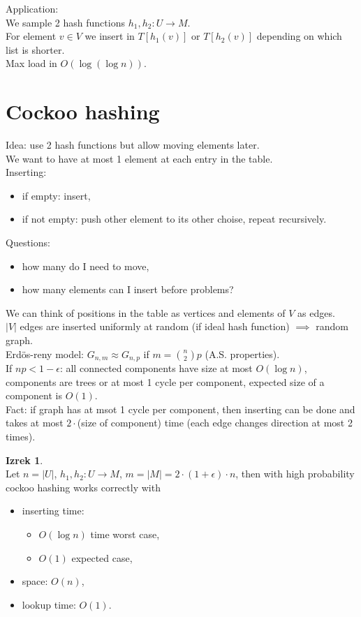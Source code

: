 \documentclass[a4paper, 12pt]{book}
\theoremstyle{definition}
\newtheorem{theorem}[counter]{Izrek}
\theoremstyle{remark}
\begin{document}
Application: \\
We sample 2 hash functions $h_1, h_2: U \to M$. \\
For element $v \in V$ we insert in $T[h_1(v)]$ or $T[h_2(v)]$ depending on which list is shorter. \\
Max load in $O(\log (\log n))$.


\section{Cockoo hashing}

Idea: use 2 hash functions but allow moving elements later. \\
We want to have at most 1 element at each entry in the table. \\
Inserting: \\ %
\begin{itemize}
  \item if empty: insert,
  \item if not empty: push other element to its other choise, repeat recursively.
\end{itemize}
Questions:
\begin{itemize}
  \item how many do I need to move,
  \item how many elements can I insert before problems?
\end{itemize}
We can think of positions in the table as vertices and elements of $V$ as edges. \\
$|V|$ edges are inserted uniformly at random (if ideal hash function)
$\implies$ random graph. \\
Erdös-reny model: $G_{n,m} \approx G_{n,p}$ if $m = \binom{n}{2} p$ (A.S. properties). \\
If $np < 1 - \epsilon$: all connected components have size at most $O(\log n)$,
components are trees or at most 1 cycle per component, expected size of a component is $O(1)$. \\
Fact: if graph has at msot 1 cycle per component, then inserting can be done and takes at most
$2 \cdot $(size of component) time (each edge changes direction at most 2 times).
\begin{theorem} \text{} \\
  Let $n = |U|$, $h_1, h_2: U \to M$, $m = |M| = 2 \cdot (1 + \epsilon) \cdot n$,
  then with high probability cockoo hashing works correctly with
  \begin{itemize}
    \item inserting time:
      \begin{itemize}
        \item $O(\log n)$ time worst case,
        \item $O(1)$ expected case,
      \end{itemize}
    \item space: $O(n)$,
    \item lookup time: $O(1)$.
  \end{itemize}
\end{theorem}
\end{document}
